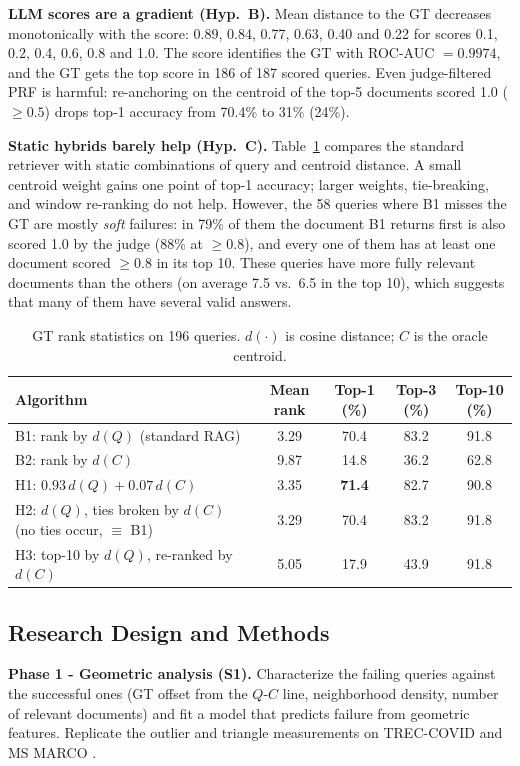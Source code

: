 \documentclass[11pt,a4paper]{article}
\begin{document}
\textbf{LLM scores are a gradient (Hyp.~B).} Mean distance to the GT decreases monotonically with the score: 0.89, 0.84, 0.77, 0.63, 0.40 and 0.22 for scores 0.1, 0.2, 0.4, 0.6, 0.8 and 1.0. The score identifies the GT with ROC-AUC $=0.9974$, and the GT gets the top score in 186 of 187 scored queries. Even judge-filtered PRF is harmful: re-anchoring on the centroid of the top-5 documents scored 1.0 ($\geq0.5$) drops top-1 accuracy from 70.4\% to 31\% (24\%).

\textbf{Static hybrids barely help (Hyp.~C).} Table~\ref{tab:results} compares the standard retriever with static combinations of query and centroid distance. A small centroid weight gains one point of top-1 accuracy; larger weights, tie-breaking, and window re-ranking do not help. However, the 58 queries where B1 misses the GT are mostly \emph{soft} failures: in 79\% of them the document B1 returns first is also scored 1.0 by the judge (88\% at $\geq0.8$), and every one of them has at least one document scored $\geq0.8$ in its top 10. These queries have more fully relevant documents than the others (on average 7.5 vs.\ 6.5 in the top 10), which suggests that many of them have several valid answers.

\begin{table}[H]
\centering\small
\caption{GT rank statistics on 196 queries. $d(\cdot)$ is cosine distance; $C$ is the oracle centroid.}
\label{tab:results}
\begin{tabularx}{\textwidth}{Xcccc}
\toprule
Algorithm & Mean rank & Top-1 (\%) & Top-3 (\%) & Top-10 (\%) \\
\midrule
B1: rank by $d(Q)$ (standard RAG)                      & 3.29 & 70.4 & 83.2 & 91.8 \\
B2: rank by $d(C)$                                      & 9.87 & 14.8 & 36.2 & 62.8 \\
H1: $0.93\,d(Q) + 0.07\,d(C)$                           & 3.35 & \textbf{71.4} & 82.7 & 90.8 \\
H2: $d(Q)$, ties broken by $d(C)$ (no ties occur, $\equiv$ B1) & 3.29 & 70.4 & 83.2 & 91.8 \\
H3: top-10 by $d(Q)$, re-ranked by $d(C)$               & 5.05 & 17.9 & 43.9 & 91.8 \\
\bottomrule
\end{tabularx}
\end{table}

\subsection{Research Design and Methods}
\textbf{Phase 1 - Geometric analysis (S1).} Characterize the failing queries against the successful ones (GT offset from the $Q$-$C$ line, neighborhood density, number of relevant documents) and fit a model that predicts failure from geometric features. Replicate the outlier and triangle measurements on TREC-COVID \citep{roberts2020treccovid} and MS MARCO \citep{nguyen2016msmarco}.
\end{document}
